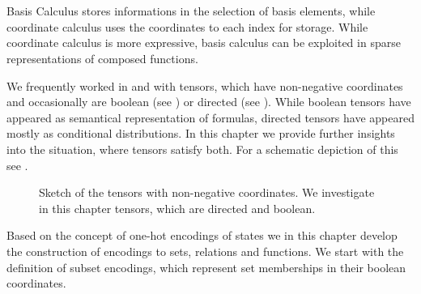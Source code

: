 \chapter{\chatextbasisCalculus}\label{cha:basisCalculus}

Basis Calculus stores informations in the selection of basis elements, while coordinate calculus uses the coordinates to each index for storage.
While coordinate calculus is more expressive, basis calculus can be exploited in sparse representations of composed functions.


We frequently worked in  and  with tensors, which have non-negative coordinates and occasionally are boolean (see ) or directed (see ).
While boolean tensors have appeared as semantical representation of formulas, directed tensors have appeared mostly as conditional distributions.
In this chapter we provide further insights into the situation, where tensors satisfy both.
For a schematic depiction of this see .

\begin{figure}[h]
    \begin{center}
        
    \end{center}
    \caption{Sketch of the tensors with non-negative coordinates.
    We investigate in this chapter tensors, which are directed and boolean.}\label{fig:dbTensorSketch}
\end{figure}




Based on the concept of one-hot encodings of states we in this chapter develop the construction of encodings to sets, relations and functions.
We start with the definition of subset encodings, which represent set memberships in their boolean coordinates.

